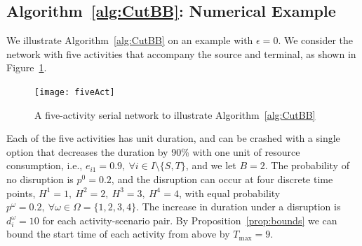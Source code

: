 \documentclass[11pt]{article}
\newcommand{\noi}{\noindent}
\begin{document}
	\subsection{Algorithm~\ref{alg:CutBB}: Numerical Example}\label{subsec:numeg}
	We illustrate Algorithm~\ref{alg:CutBB} on an example with $\epsilon=0$. We consider the network with five activities that accompany the source and terminal, as shown in Figure~\ref{fig:fiveAct}. 
	\begin{figure}[H]
		\centering
		\texttt{[image: fiveAct]}
		\caption{A five-activity serial network to illustrate Algorithm~\ref{alg:CutBB}}
		\label{fig:fiveAct}
	\end{figure}
	\noi Each of the five activities has unit duration, and can be crashed with a single option that decreases the duration by 90\% with one unit of resource consumption, i.e., \(e_{i1} = 0.9,\ \forall i \in I \setminus \{S, T\}\), and we let \(B = 2\). The probability of no disruption is \(p^0 = 0.2\), and the disruption can occur at four discrete time points, \(H^1 = 1,\ H^2 = 2,\ H^3 = 3,\ H^4 = 4\), with equal probability \(p^\omega = 0.2,\ \forall \omega \in \Omega = \{1,2,3,4\}\). The increase in duration under a disruption is \(d_i^\omega = 10\) for each activity-scenario pair. By Proposition~\ref{prop:bounds} we can bound the start time of each activity from above by \(T_{\max} = 9\). 
	
\end{document}
